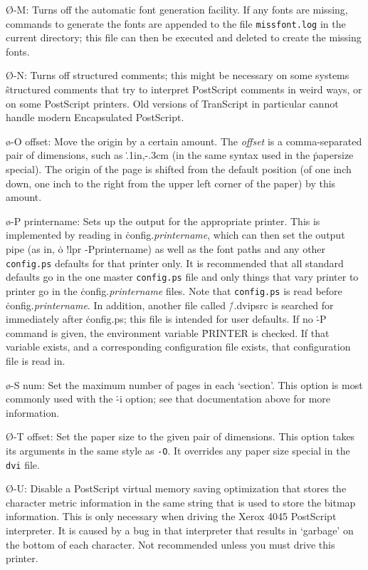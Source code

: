 {\O-M:
Turns off the automatic font generation facility.  If any fonts are
missing, commands to generate the fonts are appended to the file
{\tt missfont.log} in the current directory; this file can then be
executed and deleted to create the missing fonts.

\O-N:
Turns off structured comments; this might be necessary on some systems
\^{structured comments}
that try to interpret PostScript comments in weird ways, or on some
PostScript printers.  Old versions of TranScript in particular cannot
handle modern Encapsulated PostScript.

\o-O offset:
Move the origin by a certain amount.  The {\it offset} is a comma-separated
pair of dimensions, such as \.{.1in,-.3cm} (in the same syntax used in
the \.{papersize} special).   The origin of the page is shifted from the
default position (of one inch down, one inch to the right from the upper
left corner of the paper) by this amount.

\o-P printername:
Sets up the output for the appropriate printer.  This is implemented
by reading in \.{config.{\it printername}}, which can then set the output pipe
(as in, \.{o !lpr -Pprintername}) as well as the font paths and any other
\^{{\tt config.ps}}
defaults for that printer only.  It is recommended that all standard
defaults go in the one master {\tt config.ps}
file and only things that vary
printer to printer go in the \.{config.{\it printername}}
files.	Note that {\tt config.ps}
is read before \.{config.{\it printername}}.
In addition, another file called \.{\tilde/.dvipsrc}
is searched for immediately after \.{config.ps};
this file is intended for user defaults.  If no \.{-P} command is
given, the environment variable \.{PRINTER} is checked.  If that
variable exists, and a corresponding configuration
file exists, that configuration file is read in.

\o-S num:
Set the maximum number of pages in each `section'.  This option is most
commonly used with the \.{-i} option; see that documentation above for more
information.

\O-T offset:
Set the paper size to the given pair of dimensions.  This option takes
its arguments in the same style as {\tt -O}.  It overrides any paper
size special in the {\tt dvi} file.

\O-U:
Disable a PostScript virtual memory saving optimization that stores the
character metric information in the same string that is used to store
the bitmap information.  This is only necessary when driving the Xerox
4045 PostScript interpreter.  It is caused by a bug in that interpreter
that results in `garbage' on the bottom of each character.  Not
recommended unless you must drive this printer.

}
